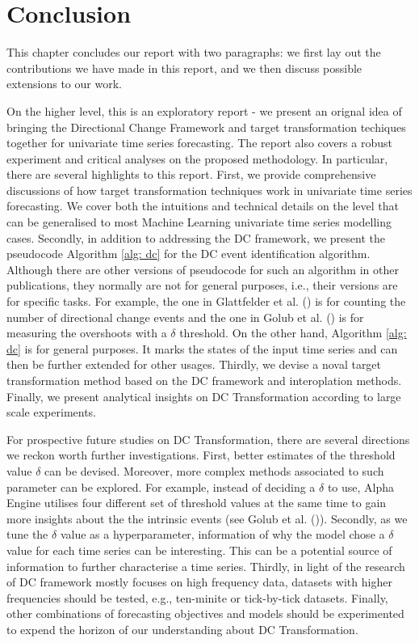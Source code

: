 \chapter{Conclusion}\label{ch: conclusion}
This chapter concludes our report with two paragraphs: we first lay out the contributions we have made in this report, and we then discuss possible extensions to our work.

On the higher level, this is an exploratory report - we present an orignal idea of bringing the Directional Change Framework and target transformation techiques together for univariate time series forecasting. The report also covers a robust experiment and critical analyses on the proposed methodology. In particular, there are several highlights to this report. First, we provide comprehensive discussions of how target transformation techniques work in univariate time series forecasting. We cover both the intuitions and technical details on the level that can be generalised to most Machine Learning univariate time series modelling cases. Secondly, in addition to addressing the DC framework, we present the pseudocode Algorithm \ref{alg: dc} for the DC event identification algorithm. Although there are other versions of pseudocode for such an algorithm in other publications, they normally are not for general purposes, i.e., their versions are for specific tasks. For example, the one in Glattfelder et al. (\citeyear{glattfelder2011patterns}) is for counting the number of directional change events and the one in Golub et al. (\citeyear{golub2016multi}) is for measuring the overshoots with a $\delta$ threshold. On the other hand, Algorithm \ref{alg: dc} is for general purposes. It marks the states of the input time series and can then be further extended for other usages. Thirdly, we devise a noval target transformation method based on the DC framework and interoplation methods. Finally, we present analytical insights on DC Transformation according to large scale experiments.

For prospective future studies on DC Transformation, there are several directions we reckon worth further investigations. First, better estimates of the threshold value $\delta$ can be devised. Moreover, more complex methods associated to such parameter can be explored. For example, instead of deciding a $\delta$ to use, Alpha Engine utilises four different set of threshold values at the same time to gain more insights about the the intrinsic events (see Golub et al. (\citeyear{golub2018alpha})). Secondly, as we tune the $\delta$ value as a hyperparameter, information of why the model chose a $\delta$ value for each time series can be interesting. This can be a potential source of information to further characterise a time series. Thirdly, in light of the research of DC framework mostly focuses on high frequency data, datasets with higher frequencies should be tested, e.g., ten-minite or tick-by-tick datasets. Finally, other combinations of forecasting objectives and models should be experimented to expend the horizon of our understanding about DC Transformation.
